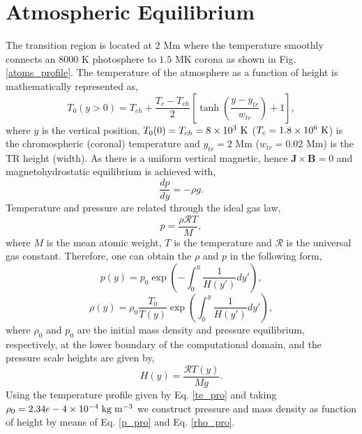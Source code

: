 \documentclass[12pt]{ociamthesis}
\newcommand{\bs}[1]{\boldsymbol{#1}}
\newcommand{\rgas}{\mathcal{R}}
\newcommand{\eref}[1]{Eq. \eqref{#1}}
\newcommand{\fref}[1]{Fig. \eqref{#1}}
\begin{document}
\section{Atmospheric Equilibrium}
\label{sec:atmos_equil}
The transition region is located at $2$ Mm where the temperature smoothly connects an $8000$ K photosphere to $1.5$ MK corona as shown in \fref{atoms_profile}. The temperature of the atmosphere as a function of height is mathematically represented as,   
\begin{equation}\label{te_pro}
T_0(y>0) = T_{ch}+\frac{T_{c} - T_{ch}}{2} \left[ \tanh \left( \frac{y-y_{tr}}{w_{tr}} \right)+1 \right],
\end{equation}
where $y$ is the vertical position, $T_0(0)=T_{ch}=8\times10^3 \ \rm{K}$ ($T_{c}=1.8\times10^6 \ \rm{K}$) is the chromospheric (coronal) temperature and $y_{tr}=2$ Mm ($w_{tr}=0.02$ Mm) is the TR height (width). As there is a uniform vertical magnetic, hence $\bs{J} \times \bs{B}=0$ and magnetohydrostatic equilibrium is achieved with,
\begin{equation}
\frac{dp}{dy} = - \rho g.
\end{equation}
Temperature and pressure are related through the ideal gas law,
\begin{equation}
p = \frac{ \rho \rgas T}{M},
\end{equation} 
where $M$ is the mean atomic weight, $T$ is the temperature and $\rgas$ is the universal gas constant. Therefore, one can obtain the $\rho$ and $p$ in the following form,  
\begin{equation}\label{p_pro}
p(y) = p_0 \exp \left( - \int_0^y  \frac{1}{H(y')} dy' \right), 
\end{equation} 
\begin{equation}\label{rho_pro}
\rho(y) = \rho_0 \frac{T_0}{T(y)} \exp \left( \int_0^y \frac{1}{H(y') }dy' \right),
\end{equation}
where $\rho_0$ and $p_0$ are the initial mass density and pressure equilibrium, respectively, at the lower boundary of the computational domain, and the pressure scale heights are given by,
\begin{equation}
H(y) = \frac{\rgas T(y)}{Mg}.
\end{equation}
Using the temperature profile given by \eref{te_pro} and taking $\rho_0 = 2.34e-4\times10^{-4}\;\rm{kg}\;\rm{m^{-3}}$ we construct pressure and mass density as function of height by means of \eref{p_pro} and \eref{rho_pro}.
\end{document}
